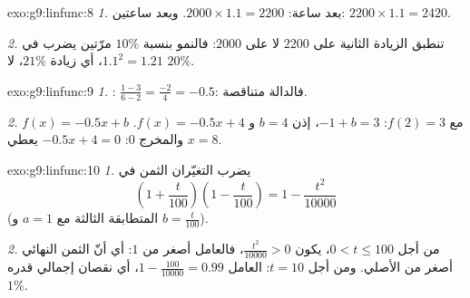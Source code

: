 \begin{solution}{exo:g9:linfunc:8}
\emph{1.} بعد ساعة: $2000 \times 1.1 = 2200$. وبعد ساعتين:
$2200 \times 1.1 = 2420$.

\emph{2.} تنطبق الزيادة الثانية على $2200$ لا على $2000$: فالنمو
بنسبة $10\%$ مرّتين يضرب في $1.1^2 = 1.21$، أي زيادة $21\%$، لا
$20\%$.
\end{solution}

\begin{solution}{exo:g9:linfunc:9}
\emph{1.} : $\frac{1 - 3}{6 - 2} = \frac{-2}{4} = -0.5$:
فالدالة متناقصة.

\emph{2.} $f(x) = -0.5x + b$ مع $f(2) = 3$: $-1 + b = 3$، إذن $b = 4$
و $f(x) = -0.5x + 4$. والمخرج $0$: $-0.5x + 4 = 0$ يعطي $x = 8$.
\end{solution}

\begin{solution}{exo:g9:linfunc:10}
\emph{1.} يضرب التغيّران الثمن في
\[
\left(1 + \frac{t}{100}\right)\left(1 - \frac{t}{100}\right)
= 1 - \frac{t^2}{10000}
\]
(المتطابقة الثالثة مع $a = 1$ و $b = \frac{t}{100}$).

\emph{2.} من أجل $0 < t \leq 100$، يكون $\frac{t^2}{10000} > 0$،
فالعامل أصغر من $1$: أي أنّ الثمن النهائي أصغر من الأصلي. ومن أجل
$t = 10$: العامل $1 - \frac{100}{10000} = 0.99$، أي نقصان إجمالي
قدره $1\%$.
\end{solution}

